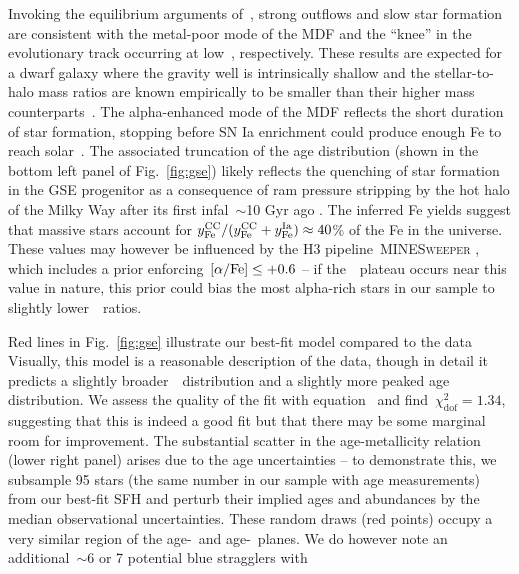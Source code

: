 \documentclass[ms.tex]{subfiles}
\begin{document}
Invoking the equilibrium arguments of~\citet{Weinberg2017}, strong outflows and
slow star formation are consistent with the metal-poor mode of the MDF and the
``knee'' in the evolutionary track occurring at low~\feh, respectively.
These results are expected for a dwarf galaxy where the gravity well is
intrinsically shallow and the stellar-to-halo mass ratios are known empirically
to be smaller than their higher mass counterparts~\citep{Hudson2015}.
The alpha-enhanced mode of the MDF reflects the short duration of star
formation, stopping before SN Ia enrichment could produce enough Fe to reach
solar~\afe.
The associated truncation of the age distribution (shown in the bottom left
panel of Fig.~\ref{fig:gse}) likely reflects the quenching of star
formation in the GSE progenitor as a consequence of ram pressure stripping by
the hot halo of the Milky Way after its first infal~$\sim$10 Gyr ago
\citep{Bonaca2020}.
The inferred Fe yields suggest that massive stars account for
$y_\text{Fe}^\text{CC} / (y_\text{Fe}^\text{CC} + y_\text{Fe}^\text{Ia}) \approx 40$\% of the Fe in the universe.
These values may however be influenced by the H3 pipeline~\textsc{MINESweeper}
\citep{Cargile2020}, which includes a prior enforcing~$\text{[$\alpha$/Fe]} \leq +0.6$ -- if
the~\afe~plateau occurs near this value in nature, this prior could bias the
most alpha-rich stars in our sample to slightly lower~\afe~ratios.
\par
Red lines in Fig.~\ref{fig:gse} illustrate our best-fit model compared to the
data
Visually, this model is a reasonable description of the data, though in detail
it predicts a slightly broader~\feh~distribution and a slightly more peaked age
distribution.
We assess the quality of the fit with equation~ and
find~$\chi_\text{dof}^2 = 1.34$, suggesting that this is indeed a good fit but
that there may be some marginal room for improvement.
The substantial scatter in the age-metallicity relation (lower right panel)
arises due to the age uncertainties -- to demonstrate this, we subsample 95
stars (the same number in our sample with age measurements) from our best-fit
SFH and perturb their implied ages and abundances by the median observational
uncertainties.
These random draws (red points) occupy a very similar region of the age-\feh~and
age-\afe~planes.
We do however note an additional~$\sim$6 or 7 potential blue stragglers with
\end{document}
